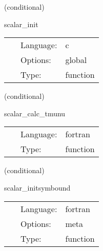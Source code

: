 \vspace{5mm}

   (conditional) 

\hspace{5mm} scalar\_init 

\hspace{5mm}{\it initialise flags and boundary condition } 


\hspace{5mm}

 \begin{tabular*}{160mm}{cll} 
~ & Language:  & c \\ 
~ & Options:  & global \\ 
~ & Type:  & function \\ 
\end{tabular*} 


\vspace{5mm}

   (conditional) 

\hspace{5mm} scalar\_calc\_tmunu 

\hspace{5mm}{\it compute the energy-momentum tensor } 


\hspace{5mm}

 \begin{tabular*}{160mm}{cll} 
~ & Language:  & fortran \\ 
~ & Type:  & function \\ 
\end{tabular*} 


\vspace{5mm}

   (conditional) 

\hspace{5mm} scalar\_initsymbound 

\hspace{5mm}{\it schedule symmetries } 


\hspace{5mm}

 \begin{tabular*}{160mm}{cll} 
~ & Language:  & fortran \\ 
~ & Options:  & meta \\ 
~ & Type:  & function \\ 
\end{tabular*} 


